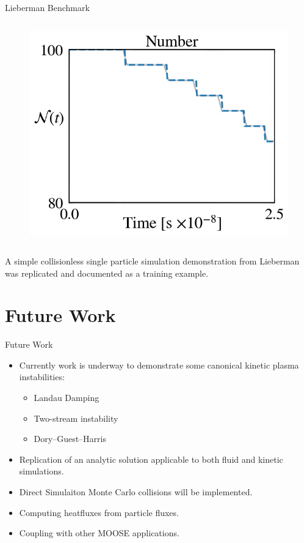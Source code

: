 \documentclass[aspectratio=169, 16pt]{beamer}
\begin{document}
\begin{frame}{Lieberman Benchmark}
\begin{columns}
\begin{figure}[H]
      \includegraphics[width=\textwidth]{figs/lieberman_population_comparison.png}
    \end{figure}
  \end{columns}
    \vspace{0.5cm}
    A simple collisionless single particle simulation demonstration from Lieberman\cite{lieberman2005} was replicated and documented as a training example.
\end{frame}

\section{Future Work}
\begin{frame}{Future Work} 
  \vfill{}
  \begin{itemize}
    \item Currently work is underway to demonstrate some canonical kinetic plasma instabilities:
    \begin{itemize}
      \item Landau Damping
      \item Two-stream instability
      \item Dory–Guest–Harris
    \end{itemize}
    \item Replication of an analytic solution applicable to both fluid and kinetic simulations\cite{lafleur2022space}.
    \item Direct Simulaiton Monte Carlo collisions will be implemented.
    \item Computing heatfluxes from particle fluxes.
    \item Coupling with other MOOSE applications.
  \end{itemize}
\end{frame}
%
\end{document}
